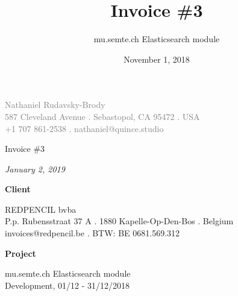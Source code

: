 \documentclass[11pt]{article}
\author{mu.semte.ch Elasticsearch module}
\date{November 1, 2018}
\title{Invoice \#3}
\begin{document}
 \thispagestyle{empty}
\centering

{\small\textcolor{gray}{
Nathaniel Rudavsky-Brody \\
587 Cleveland Avenue . Sebastopol, CA 95472 . USA\\
+1 707 861-2538  . nathaniel@quince.studio\\
}}

\vspace{4em}

{\Huge Invoice \#3	}

\vspace{1em}

{\textit{January 2, 2019}}

\vspace{1em}

{\Large\textbf{Client}}

REDPENCIL bvba\\
P.p. Rubensstraat 37 A . 1880 Kapelle-Op-Den-Bos . Belgium\\
invoices@redpencil.be . BTW: BE 0681.569.312

\vspace{1em}

{\Large\textbf{Project}}

 mu.semte.ch Elasticsearch module\\
 Development, 01/12 - 31/12/2018

\vspace{1em}
\end{document}
